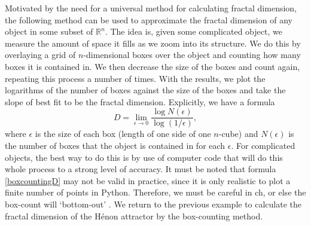 Motivated by the need for a universal method for calculating fractal dimension, the following method can be used to approximate the fractal dimension of any object in some subset of $\mathbb{R}^n$. The idea is, given some complicated object, we measure the amount of space it fills as we zoom into its structure. We do this by overlaying a grid of $n$-dimensional boxes over the object and counting how many boxes it is contained in. We then decrease the size of the boxes and count again, repeating this process a number of times. With the results, we plot the logarithms of the number of boxes against the size of the boxes and take the slope of best fit to be the fractal dimension. Explicitly, we have a formula
\begin{equation}
    D = \lim_{\epsilon \to 0} \frac{\log N(\epsilon)}{\log(1/\epsilon)},
\end{equation}\label{boxcountingD}
where $\epsilon$ is the size of each box (length of one side of one $n$-cube) and $N(\epsilon)$ is the number of boxes that the object is contained in for each $\epsilon$. For complicated objects, the best way to do this is by use of computer code that will do this whole process to a strong level of accuracy. It must be noted that formula \ref{boxcountingD} may not be valid in practice, since it is only realistic to plot a finite number of points in Python. Therefore, we must be careful in ch, or else the box-count will `bottom-out' . We return to the previous example to calculate the fractal dimension of the Hénon attractor by the box-counting method.
